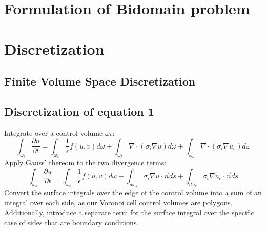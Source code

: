 \documentclass{finalproject}
\begin{document}
\section{Formulation of Bidomain problem}

\section{Discretization}
\subsection{Finite Volume Space Discretization}
\subsection{Discretization of equation 1}
Integrate over a control volume $\omega_k$:
\begin{equation}
   \int_{\omega_k}\frac{\partial u}{\partial t}=\int_{\omega_k}\frac{1}{\epsilon}f(u,v)d\omega +
       \int_{\omega_k}\nabla \cdot (\sigma_i \nabla u)d\omega + \int_{\omega_k}\nabla \cdot (\sigma_i \nabla u_e)d\omega
\end{equation}
Apply Gauss' thereom to the two divergence terms:
\begin{equation}
    \int_{\omega_k}\frac{\partial u}{\partial t} =\int_{\omega_k}\frac{1}{\epsilon}f(u,v)d\omega +
    \int_{d\omega_k}\sigma_i \nabla u \cdot \overrightarrow{n}ds +
    \int_{d\omega_k}\sigma_i \nabla u_e \cdot \overrightarrow{n}ds
\end{equation}
Convert the surface integrals over the edge of the control volume into a sum of an integral over each side, as our Voronoi cell control volumes are polygons. Additionally, introduce a separate term for the surface integral over the specific case of sides that are boundary conditions.
\end{document}
